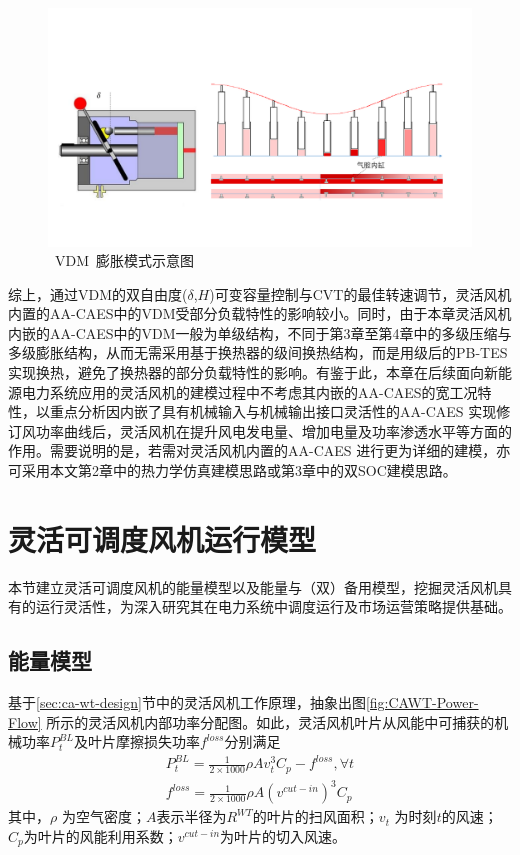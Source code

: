 \begin{figure}[H] %
  \centering
  \includegraphics[scale=0.45]{figures/Chap5-12-VDM-Expan.pdf}
  \caption{~VDM~膨胀模式示意图}
  \label{fig:chap5-cawt-vdm-expan}
\end{figure}

综上，通过VDM的双自由度($\delta$,$H$)可变容量控制与CVT的最佳转速调节，灵活风机内置的AA-CAES中的VDM受部分负载特性的影响较小。同时，由于本章灵活风机内嵌的AA-CAES中的VDM一般为单级结构，不同于第3章至第4章中的多级压缩与多级膨胀结构，从而无需采用基于换热器的级间换热结构，而是用级后的PB-TES实现换热，避免了换热器的部分负载特性的影响。有鉴于此，本章在后续面向新能源电力系统应用的灵活风机的建模过程中不考虑其内嵌的AA-CAES的宽工况特性，以重点分析因内嵌了具有机械输入与机械输出接口灵活性的AA-CAES 实现修订风功率曲线后，灵活风机在提升风电发电量、增加电量及功率渗透水平等方面的作用。需要说明的是，若需对灵活风机内置的AA-CAES 进行更为详细的建模，亦可采用本文第2章中的热力学仿真建模思路或第3章中的双SOC建模思路。

\section{灵活可调度风机运行模型}
\label{sec:ca-wt-model}
本节建立灵活可调度风机的能量模型以及能量与（双）备用模型，挖掘灵活风机具有的运行灵活性，为深入研究其在电力系统中调度运行及市场运营策略提供基础。

\subsection{能量模型}
\label{sec:ca-wt-model-energy}
基于\ref{sec:ca-wt-design}节中的灵活风机工作原理，抽象出图\ref{fig:CAWT-Power-Flow} 所示的灵活风机内部功率分配图。如此，灵活风机叶片从风能中可捕获的机械功率$P_t^{BL}$及叶片摩擦损失功率$ {f^{loss}}$分别满足
\begin{subequations}
\label{eq:CA-WT-Wind-Blade-Energy}
\begin{gather}
P_t^{BL} = \frac{1}{{2 \times 1000}}\rho Av_t^3{C_p} - {f^{loss}},\forall t\\
{f^{loss}} = \frac{1}{{2 \times 1000}}\rho A{({{v^{cut - in}}})^3}{C_p}
\end{gather}
\end{subequations}
其中，$\rho $ 为空气密度；$A$表示半径为${R^{WT}}$的叶片的扫风面积；$v_t$ 为时刻$t$的风速；$C_p$为叶片的风能利用系数；$v^{cut-in}$为叶片的切入风速。

